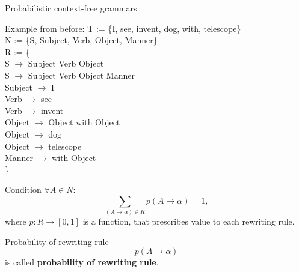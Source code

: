 \documentclass[t,usenames,dvipsnames]{beamer} %
\newcommand{\algoii}{
    \begin{algorithm}[H]
    \caption{Function \textit{generate}, that uses probabilistic grammars
        }
    \raggedright
    \textbf{Input:} Probabilistic grammar $G=(N,T,R,S)$, 
        symbol $A \in N$ \\
    \textbf{Output:} Sentence $s$ in grammar $G$
    \begin{algorithmic}[1]
    \Function{Generate}{$G$, $A$} %
    \State $s \gets [\,\,]$ 
    \State Randomly choose rewriting rule 
    $(A \to A_1\ A_2 \cdots A_k ) \in R$
    \For{$i=1, ..., k$}
    \If{$A_i \in T$} 
    \State $s = s$.append($A_i$) 
    \Else 
    \State $s_i$ = \Call{Generate}{$G$, $A_i$}
    \State $s = s$.append($s_i$) 
    \EndIf
    \EndFor
    \State \Return $s$
    \EndFunction
    \end{algorithmic}
    \end{algorithm}
}
\newcommand{\1}{\boldsymbol{1}}
\newcommand{\0}{\boldsymbol{0}}
\begin{document}
\begin{frame}{Probabilistic context-free grammars}
\pause
\begin{block}{Example from before:} 
T := \{I, see, invent, dog, with, telescope\} \\
N := \{S, Subject, Verb, Object, Manner\}  \\
R := \{ \\
    S $\to$ Subject Verb Object   \\
    S $\to$ Subject Verb Object Manner  \\
    Subject $\to$ I  \\
    Verb $\to$ see  \\
    Verb $\to$ invent  \\
    Object $\to$ Object with Object  \\
    Object $\to$ dog  \\
    Object $\to$ telescope  \\
    Manner $\to$ with Object  \\
\}
\end{block}
\end{frame}


 \begin{frame}

\begin{block}{Condition}
	\( \forall A \in N:\)
	\[ \sum_{ (A\to \alpha) \in R }  p(A \to \alpha) = 1, \]
	where \( p: R \to [0,1] \) is a function,
	that prescribes value to each rewriting rule.
\end{block}

\begin{block}{Probability of rewriting rule}
$$ p(A \to \alpha) $$
    is called \textbf{probability of rewriting rule}.
\end{block}

\end{frame}


\end{document}
